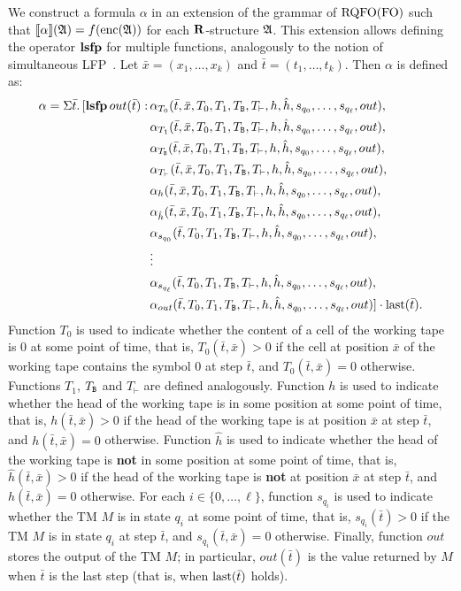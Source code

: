 We construct a formula $\alpha$ in an extension of the grammar of ${\rm RQFO}({\rm FO})$ such that ${\llbracket{}{\alpha}\rrbracket}(\mathfrak{A}) = f({\rm enc}(\mathfrak{A}))$ for each $\mathbf{R}$-structure $\mathfrak{A}$. This extension allows defining the operator ${\bf lsfp}$ for multiple functions, analogously to the notion of simultaneous LFP~\cite{L04}.
Let $\bar{x} = (x_1,\ldots,x_k)$ and $\bar{t} = (t_1,\ldots,t_k)$. Then $\alpha$ is defined as:
\begin{align*}
\alpha = \Sigma{\bar{t}}.\,[{\bf lsfp} \, out(\bar{t}): \,&\alpha_{T_0}(\bar{t},\bar{x},T_0,T_1,T_{\mathtt{B}},T_{\vdash},h,\hat{h},s_{q_0},\ldots,s_{q_{\ell}},out),\\
	&\alpha_{T_1}(\bar{t},\bar{x},T_0,T_1,T_{\mathtt{B}},T_{\vdash},h,\hat{h},s_{q_0},\ldots,s_{q_{\ell}},out),\\
	&\alpha_{T_{\mathtt{B}}}(\bar{t},\bar{x},T_0,T_1,T_{\mathtt{B}},T_{\vdash},h,\hat{h},s_{q_0},\ldots,s_{q_{\ell}},out),\\
	&\alpha_{T_{\vdash}}(\bar{t},\bar{x},T_0,T_1,T_{\mathtt{B}},T_{\vdash},h,\hat{h},s_{q_0},\ldots,s_{q_{\ell}},out),\\
	&\alpha_{h}(\bar{t},\bar{x},T_0,T_1,T_{\mathtt{B}},T_{\vdash},h,\hat{h},s_{q_0},\ldots,s_{q_{\ell}},out),\\
	&\alpha_{\hat{h}}(\bar{t},\bar{x},T_0,T_1,T_{\mathtt{B}},T_{\vdash},h,\hat{h},s_{q_0},\ldots,s_{q_{\ell}},out),\\
	&\alpha_{s_{q_0}}(\bar{t},T_0,T_1,T_{\mathtt{B}},T_{\vdash},h,\hat{h},s_{q_0},\ldots,s_{q_{\ell}},out),\\
	&\vdots \\
	&\alpha_{s_{q_{\ell}}}(\bar{t},T_0,T_1,T_{\mathtt{B}},T_{\vdash},h,\hat{h},s_{q_0},\ldots,s_{q_{\ell}},out),\\
	&\alpha_{out}(\bar{t},T_0,T_1,T_{\mathtt{B}},T_{\vdash},h,\hat{h},s_{q_0},\ldots,s_{q_{\ell}},out)]\cdot \operatorname{last}(\bar{t}).
\end{align*}
Function $T_0$ is used to indicate whether the content of a cell of the working tape is 0 at some point of time, that is, $T_0(\bar{t},\bar{x}) > 0$ if the cell at position $\bar{x}$ of the working tape contains the symbol 0 at step $\bar{t}$, and $T_0(\bar{t},\bar{x}) = 0$ otherwise. Functions $T_1$, $T_{\mathtt{B}}$ and $T_{\vdash}$ are defined analogously. Function $h$ is used to indicate whether the head of the working tape is in some position at some point of time, that is, $h(\bar{t},\bar{x}) > 0$ if the head of the working tape is at position $\bar{x}$ at step $\bar{t}$, and $h(\bar{t},\bar{x}) = 0$ otherwise. 
Function $\hat{h}$ is used to indicate whether the head of the working tape is {\bf not} in some position at some point of time, that is, $\hat{h}(\bar{t},\bar{x}) > 0$ if the head of the working tape is {\bf not} at position $\bar{x}$ at step $\bar{t}$, and $h(\bar{t},\bar{x}) = 0$ otherwise. For each $i \in \{0, \ldots, \ell\}$, function 
$s_{q_i}$ is used to indicate whether the TM $M$ is in state $q_i$ at some point of time, that is, $s_{q_i}(\bar{t}) > 0$ if the TM $M$ is in state $q_i$ at step $\bar{t}$, and $s_{q_i}(\bar{t},\bar{x}) = 0$ otherwise. Finally, function $out$ stores the output of the TM $M$; in particular, $out(\bar t)$ is the value returned by $M$ when $\bar t$ is the last step (that is, when $\operatorname{last}(\bar t)$ holds).

